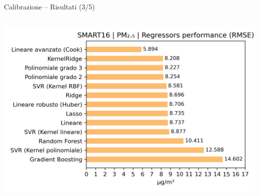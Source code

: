 \begin{frame}{Calibrazione – Risultati (3/5)}
\begin{columns}
\begin{column}{0.55\textwidth}
\begin{center}
\includegraphics[width=.8\textwidth]{images/hist_pm2.5_2.png}
\end{center}
\end{column}

\end{columns}
\end{frame}

